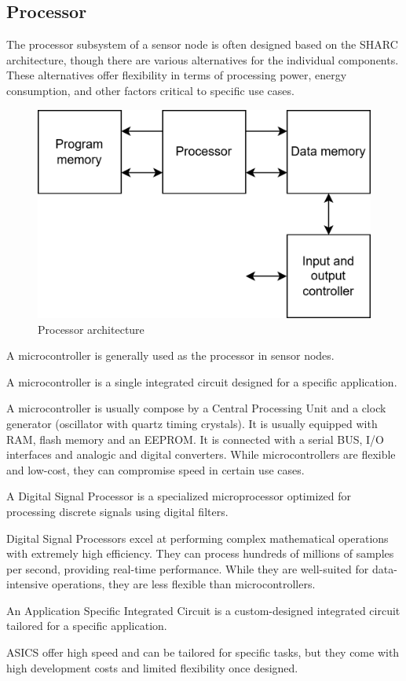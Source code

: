 \subsection{Processor}
The processor subsystem of a sensor node is often designed based on the SHARC architecture, though there are various alternatives for the individual components. 
These alternatives offer flexibility in terms of processing power, energy consumption, and other factors critical to specific use cases.
\begin{figure}[H]
    \centering
    \includegraphics[width=0.5\linewidth]{images/pss.png}
    \caption{Processor architecture}
\end{figure}
A microcontroller is generally used as the processor in sensor nodes.
\begin{definition}
    A microcontroller is a single integrated circuit designed for a specific application.
\end{definition}
A microcontroller is usually compose by a Central Processing Unit and a clock generator (oscillator with quartz timing crystals). 
It is usually equipped with RAM, flash memory and an EEPROM. 
It is connected with a serial BUS, I/O interfaces and analogic and digital converters. 
While microcontrollers are flexible and low-cost, they can compromise speed in certain use cases.

\begin{definition}
    A Digital Signal Processor is a specialized microprocessor optimized for processing discrete signals using digital filters.
\end{definition}
Digital Signal Processors excel at performing complex mathematical operations with extremely high efficiency. 
They can process hundreds of millions of samples per second, providing real-time performance. 
While they are well-suited for data-intensive operations, they are less flexible than microcontrollers.

\begin{definition}
    An Application Specific Integrated Circuit is a custom-designed integrated circuit tailored for a specific application.
\end{definition}
ASICS offer high speed and can be tailored for specific tasks, but they come with high development costs and limited flexibility once designed.

